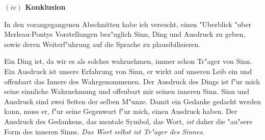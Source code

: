 \documentclass[a4paper, 12pt]{article}
\begin{document}
\begin{onehalfspace}
\vspace{5mm}

\noindent\textbf{$(iv)$ Konklusion}

\noindent In den vorangegangenen Abschnitten habe ich versucht, einen "Uberblick "uber Merleau-Pontys Vorstellungen bez"uglich Sinn, Ding und Ausdruck zu geben, sowie deren Weiterf"uhrung auf die Sprache zu plausibilisieren. 

Ein Ding ist, da wir es als solches wahrnehmen, immer schon Tr"ager von Sinn. Ein Ausdruck ist unsere Erfahrung von Sinn, er wirkt auf unseren Leib ein und offenbart das Innere des Wahrgenommenen. Der Ausdruck des Dings ist f"ur mich seine sinnliche Wahrnehmung und offenbart mir seinen inneren Sinn. Sinn und Ausdruck sind zwei Seiten der selben M"unze. Damit ein Gedanke gedacht werden kann, muss er, f"ur seine Gegenwart f"ur mich, einen Ausdruck haben. Der Ausdruck des Gedankens, das mentale Symbol, das Wort, \emph{ist} daher die "au"sere Form des inneren Sinns. \emph{Das Wort selbst ist Tr"ager des Sinnes}.



\end{onehalfspace}
\nocite{*}
%
\printbibliography
\end{document}
